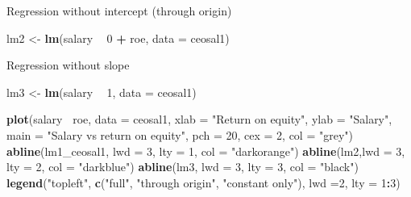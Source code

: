 \documentclass[]{book}
\newenvironment{Shaded}{\begin{snugshade}}{\end{snugshade}}
\newcommand{\DataTypeTok}[1]{\textcolor[rgb]{0.13,0.29,0.53}{#1}}
\newcommand{\DecValTok}[1]{\textcolor[rgb]{0.00,0.00,0.81}{#1}}
\newcommand{\KeywordTok}[1]{\textcolor[rgb]{0.13,0.29,0.53}{\textbf{#1}}}
\newcommand{\NormalTok}[1]{#1}
\newcommand{\OperatorTok}[1]{\textcolor[rgb]{0.81,0.36,0.00}{\textbf{#1}}}
\newcommand{\StringTok}[1]{\textcolor[rgb]{0.31,0.60,0.02}{#1}}
\begin{document}
Regression without intercept (through origin)

\begin{Shaded}
\begin{Highlighting}[]
\NormalTok{lm2 <-}\StringTok{ }\KeywordTok{lm}\NormalTok{(salary }\OperatorTok{~}\StringTok{  }\DecValTok{0} \OperatorTok{+}\StringTok{ }\NormalTok{roe, }\DataTypeTok{data =}\NormalTok{ ceosal1)}
\end{Highlighting}
\end{Shaded}

Regression without slope

\begin{Shaded}
\begin{Highlighting}[]
\NormalTok{lm3 <-}\StringTok{ }\KeywordTok{lm}\NormalTok{(salary }\OperatorTok{~}\StringTok{ }\DecValTok{1}\NormalTok{, }\DataTypeTok{data =}\NormalTok{ ceosal1)}
\end{Highlighting}
\end{Shaded}

\begin{Shaded}
\begin{Highlighting}[]
\KeywordTok{plot}\NormalTok{(salary}\OperatorTok{~}\StringTok{ }\NormalTok{roe, }\DataTypeTok{data =}\NormalTok{ ceosal1,}
     \DataTypeTok{xlab =} \StringTok{"Return on equity"}\NormalTok{,}
     \DataTypeTok{ylab =} \StringTok{"Salary"}\NormalTok{,}
     \DataTypeTok{main =} \StringTok{"Salary vs return on equity"}\NormalTok{,}
     \DataTypeTok{pch  =} \DecValTok{20}\NormalTok{,}
     \DataTypeTok{cex  =} \DecValTok{2}\NormalTok{,}
     \DataTypeTok{col  =} \StringTok{"grey"}\NormalTok{)}
\KeywordTok{abline}\NormalTok{(lm1_ceosal1, }\DataTypeTok{lwd =} \DecValTok{3}\NormalTok{, }\DataTypeTok{lty =} \DecValTok{1}\NormalTok{, }\DataTypeTok{col =} \StringTok{"darkorange"}\NormalTok{)}
\KeywordTok{abline}\NormalTok{(lm2,}\DataTypeTok{lwd =} \DecValTok{3}\NormalTok{,  }\DataTypeTok{lty =} \DecValTok{2}\NormalTok{,   }\DataTypeTok{col =} \StringTok{"darkblue"}\NormalTok{)}
\KeywordTok{abline}\NormalTok{(lm3, }\DataTypeTok{lwd =} \DecValTok{3}\NormalTok{,  }\DataTypeTok{lty =} \DecValTok{3}\NormalTok{,   }\DataTypeTok{col =} \StringTok{"black"}\NormalTok{)}
\KeywordTok{legend}\NormalTok{(}\StringTok{"topleft"}\NormalTok{, }
       \KeywordTok{c}\NormalTok{(}\StringTok{"full"}\NormalTok{, }
         \StringTok{"through origin"}\NormalTok{, }
         \StringTok{"constant only"}\NormalTok{), }
       \DataTypeTok{lwd =}\DecValTok{2}\NormalTok{, }
       \DataTypeTok{lty =} \DecValTok{1}\OperatorTok{:}\DecValTok{3}\NormalTok{)}
\end{Highlighting}
\end{Shaded}
\end{document}

